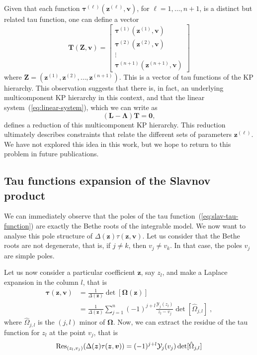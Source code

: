 \documentclass[a4paper,12pt]{amsart}
\begin{document}
Given that each function \(\bm{\tau}^{(\ell)}(\bm{z}^{(\ell)}, \bm{v})\), for
\(\ell = 1, \dots, n+1\), is a distinct but related tau function, one
can define a vector
\begin{equation}
  \bm{T}(\bm{Z}, \bm{v}) = 
\begin{bmatrix}
\bm{\tau}^{(1)}(\bm{z}^{(1)}, \bm{v}) \\ 
\bm{\tau}^{(2)}(\bm{z}^{(2)}, \bm{v}) \\ 
\vdots \\ 
\bm{\tau}^{(n+1)}(\bm{z}^{(n+1)}, \bm{v})
\end{bmatrix}
\end{equation}
where \(\bm{Z} = (\bm{z}^{(1)}, \bm{z}^{(2)}, \dots,
\bm{z}^{(n+1)})\). This is a vector of tau functions of the KP
hierarchy. This observation suggests that there is, in fact, an
underlying multicomponent KP hierarchy in this context, and that the
linear system~(\ref{eq:linear-system}), which we can write as
\begin{equation}
\left( \bm{L} - \bm{\Lambda} \right) \bm{T} = \bm{0},
\end{equation}
defines a reduction of this multicomponent KP hierarchy. This
reduction ultimately describes constraints that relate the different
sets of parameters \(\bm{z}^{(\ell)}\).  We have not explored this
idea in this work, but we hope to return to this problem in future
publications.


\subsection{Tau functions expansion of the Slavnov product}
We can immediately observe that the poles of the tau
function~(\ref{eq:slav-tau-function}) are exactly the Bethe roots of
the integrable model.  We now want to analyse this pole structure of
\(\Delta(\bm{z})\tau(\bm{z}, \bm{v})\).  Let us consider that the
Bethe roots are not degenerate, that is, if \(j \neq k\), then \(v_j
\neq v_k\). In that case, the poles \(v_j\) are simple poles.

Let us now consider a particular coefficient \(\bm{z}\), say \(z_l\), and
make a Laplace expansion in the column \(l\), that is
\begin{equation}
\label{eq:minor-expansion}
\begin{split}
  \bm{\tau}(\bm{z}, \bm{v})
  & = \frac{1}{\Delta(\bm{z})} \det[\bm{\Omega}(\bm{z}) ] \\
  & = \frac{1}{\Delta(\bm{z})} \sum_{j=1}^n (-1)^{j + l} \frac{\mathcal{Y}_j(z_l)}{z_l - v_j  } 
  \det[\hat{\Omega}_{j, l}]\; ,
\end{split}
\end{equation}
where \(\hat{\Omega}_{j,l} \) is the \((j, l)\) minor of
\(\bm{\Omega}\).  Now, we can extract the residue of the tau function
for \(z_l\) at the point \(v_j\), that is
\begin{equation}
  \operatorname{Res}_{(z_l, v_j)}(\Delta(\bm{z})\tau(\bm{z}, \bm{v})) = (-1)^{j+l} \mathcal{Y}_j(v_j) \det[\hat{\Omega}_{j, l}]
\end{equation}
\end{document}
